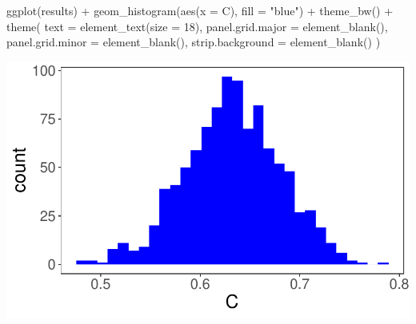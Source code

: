 \documentclass[
  letterpaper,
  DIV=11,
  numbers=noendperiod]{scrartcl}
\newenvironment{Shaded}{\begin{snugshade}}{\end{snugshade}}
\newcommand{\AttributeTok}[1]{\textcolor[rgb]{0.40,0.45,0.13}{#1}}
\newcommand{\CommentTok}[1]{\textcolor[rgb]{0.37,0.37,0.37}{#1}}
\newcommand{\ConstantTok}[1]{\textcolor[rgb]{0.56,0.35,0.01}{#1}}
\newcommand{\DecValTok}[1]{\textcolor[rgb]{0.68,0.00,0.00}{#1}}
\newcommand{\FloatTok}[1]{\textcolor[rgb]{0.68,0.00,0.00}{#1}}
\newcommand{\FunctionTok}[1]{\textcolor[rgb]{0.28,0.35,0.67}{#1}}
\newcommand{\NormalTok}[1]{\textcolor[rgb]{0.00,0.23,0.31}{#1}}
\newcommand{\SpecialCharTok}[1]{\textcolor[rgb]{0.37,0.37,0.37}{#1}}
\newcommand{\StringTok}[1]{\textcolor[rgb]{0.13,0.47,0.30}{#1}}
\begin{document}
\begin{Shaded}
\begin{Highlighting}[]
\FunctionTok{ggplot}\NormalTok{(results)  }\SpecialCharTok{+} 
    \FunctionTok{geom\_histogram}\NormalTok{(}\FunctionTok{aes}\NormalTok{(}\AttributeTok{x =}\NormalTok{ C), }\AttributeTok{fill =} \StringTok{"blue"}\NormalTok{) }\SpecialCharTok{+} 
    \FunctionTok{theme\_bw}\NormalTok{() }\SpecialCharTok{+}
    \FunctionTok{theme}\NormalTok{(}
        \AttributeTok{text =} \FunctionTok{element\_text}\NormalTok{(}\AttributeTok{size =} \DecValTok{18}\NormalTok{),}
        \AttributeTok{panel.grid.major =} \FunctionTok{element\_blank}\NormalTok{(),}
        \AttributeTok{panel.grid.minor =} \FunctionTok{element\_blank}\NormalTok{(),}
        \AttributeTok{strip.background =} \FunctionTok{element\_blank}\NormalTok{()}
\NormalTok{    )}
\end{Highlighting}
\end{Shaded}

\includegraphics{index_files/figure-pdf/unnamed-chunk-2-3.pdf}

\begin{Shaded}
\end{Shaded}
\end{document}
